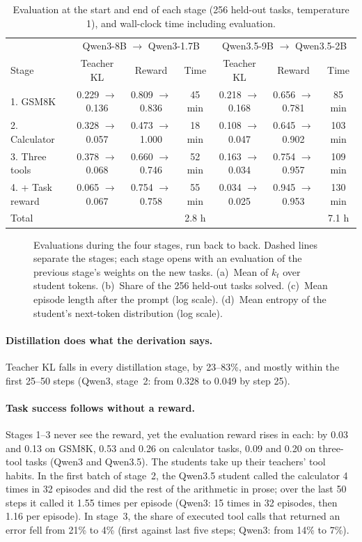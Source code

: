 \documentclass[11pt,a4paper]{article}
\begin{document}
\begin{table}[t]
\centering\small
\caption{Evaluation at the start and end of each stage (256 held-out tasks,
temperature 1), and wall-clock time including evaluation.}
\label{tab:results}
\setlength{\tabcolsep}{4.5pt}
\begin{tabular}{@{}lcccccc@{}}
\toprule
\headrow & \multicolumn{3}{c}{Qwen3-8B $\to$ Qwen3-1.7B}
 & \multicolumn{3}{c}{Qwen3.5-9B $\to$ Qwen3.5-2B} \\
\headrow Stage & Teacher KL & Reward & Time & Teacher KL & Reward & Time \\
\midrule
1. GSM8K & 0.229 $\to$ 0.136 & 0.809 $\to$ 0.836 & 45 min
  & 0.218 $\to$ 0.168 & 0.656 $\to$ 0.781 & 85 min \\
2. Calculator & 0.328 $\to$ 0.057 & 0.473 $\to$ 1.000 & 18 min
  & 0.108 $\to$ 0.047 & 0.645 $\to$ 0.902 & 103 min \\
3. Three tools & 0.378 $\to$ 0.068 & 0.660 $\to$ 0.746 & 52 min
  & 0.163 $\to$ 0.034 & 0.754 $\to$ 0.957 & 109 min \\
4. + Task reward & 0.065 $\to$ 0.067 & 0.754 $\to$ 0.758 & 55 min
  & 0.034 $\to$ 0.025 & 0.945 $\to$ 0.953 & 130 min \\
\midrule
Total & & & 2.8 h & & & 7.1 h \\
\bottomrule
\end{tabular}
\end{table}

\begin{figure}[t]
\centering

\caption{Evaluations during the four stages, run back to back. Dashed lines
separate the stages; each stage opens with an evaluation of the previous
stage's weights on the new tasks. (a)~Mean of $k_t$ over student tokens.
(b)~Share of the 256 held-out tasks solved. (c)~Mean episode length after
the prompt (log scale). (d)~Mean entropy of the student's next-token
distribution (log scale).}
\label{fig:curves}
\end{figure}

\paragraph{Distillation does what the derivation says.}
Teacher KL falls in every distillation stage, by 23--83\%, and mostly within
the first 25--50 steps (Qwen3, stage~2: from 0.328 to 0.049 by step 25).

\paragraph{Task success follows without a reward.}
Stages 1--3 never see the reward, yet the evaluation reward rises in each:
by 0.03 and 0.13 on GSM8K, 0.53 and 0.26 on calculator tasks, 0.09 and 0.20
on three-tool tasks (Qwen3 and Qwen3.5). The students take up their
teachers' tool habits. In the first batch of stage~2, the Qwen3.5 student
called the calculator 4 times in 32 episodes and did the rest of the
arithmetic in prose; over the last 50 steps it called it 1.55 times per
episode (Qwen3: 15 times in 32 episodes, then 1.16 per episode). In
stage~3, the share of executed tool calls that returned an error fell from
21\% to 4\% (first against last five steps; Qwen3: from 14\% to 7\%).
\end{document}
